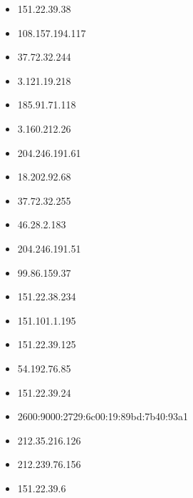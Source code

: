\documentclass{article}
\begin{document}
\begin{itemize}
    
        
            \item 151.22.39.38
        
            \item 108.157.194.117
        
            \item 37.72.32.244
        
            \item 3.121.19.218
        
            \item 185.91.71.118
        
            \item 3.160.212.26
        
            \item 204.246.191.61
        
            \item 18.202.92.68
        
            \item 37.72.32.255
        
            \item 46.28.2.183
        
            \item 204.246.191.51
        
            \item 99.86.159.37
        
            \item 151.22.38.234
        
            \item 151.101.1.195
        
            \item 151.22.39.125
        
            \item 54.192.76.85
        
            \item 151.22.39.24
        
            \item 2600:9000:2729:6c00:19:89bd:7b40:93a1
        
            \item 212.35.216.126
        
            \item 212.239.76.156
        
            \item 151.22.39.6
        

\end{itemize}
\end{document}
